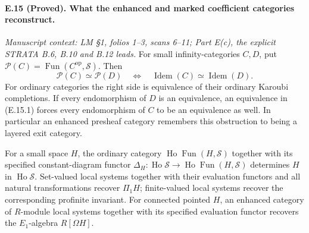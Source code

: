 \paragraph{E.15 (Proved). What the enhanced and marked coefficient categories reconstruct.}
\textit{Manuscript context: LM \S1, folios 1--3, scans 6--11;
Part E(c), the explicit STRATA B.6, B.10 and B.12 leads.}
For small infinity-categories $C,D$, put
$\mathcal P(C)=\operatorname{Fun}(C^{\mathrm{op}},\mathcal S)$.
Then
\[
 \mathcal P(C)\simeq\mathcal P(D)
 \quad\Longleftrightarrow\quad
 \operatorname{Idem}(C)\simeq\operatorname{Idem}(D).
                                                        \tag{E.15.1}
\]
For ordinary categories the right side is equivalence of their ordinary
Karoubi completions. If every endomorphism of $D$ is an equivalence,
an equivalence in (E.15.1) forces every endomorphism of $C$ to be an
equivalence as well. In particular an enhanced presheaf category
remembers this obstruction to being a layered exit category.

For a small space $H$, the ordinary category
$\operatorname{Ho}\operatorname{Fun}(H,\mathcal S)$ together with
its specified constant-diagram functor
$\Delta_H:\operatorname{Ho}\mathcal S\to
\operatorname{Ho}\operatorname{Fun}(H,\mathcal S)$ determines $H$
in $\operatorname{Ho}\mathcal S$. Set-valued local systems together
with their evaluation functors and all natural transformations recover
$\Pi_1H$; finite-valued local systems recover the corresponding
profinite invariant. For connected pointed $H$, an enhanced category
of $R$-module local systems together with its specified evaluation
functor recovers the $E_1$-algebra $R[\Omega H]$.

